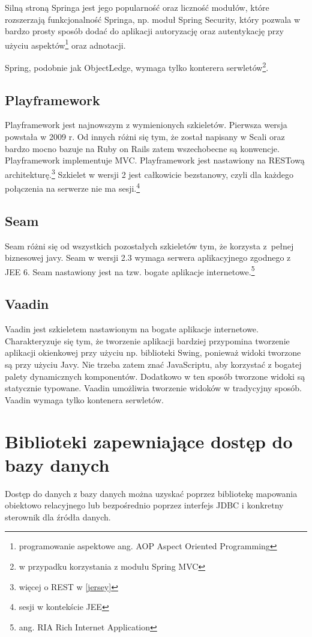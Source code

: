 \documentclass[a4paper,onecolumn,oneside,11pt,wide,floatssmall]{mwrep}
\theoremstyle{definition}
\theoremstyle{plain}%
\theoremstyle{remark}
\begin{document}
Silną stroną Springa jest jego popularność oraz liczność modułów, które rozszerzają funkcjonalność Springa, np. moduł Spring Security, który pozwala w bardzo prosty sposób dodać do aplikacji autoryzację oraz autentykację przy użyciu aspektów\footnote{programowanie aspektowe ang. AOP Aspect Oriented Programming} oraz adnotacji.

Spring, podobnie jak ObjectLedge, wymaga tylko 
konterera serwletów\footnote{w przypadku korzystania z modułu Spring MVC}.

\subsection{Playframework}
Playframework \cite{playframeworkHome} jest najnowszym z wymienionych szkieletów. Pierwsza wersja powstała w 2009 r. Od innych różni się tym, że został napisany w Scali oraz bardzo mocno bazuje na Ruby on Rails zatem wszechobecne są konwencje. Playframework implementuje MVC. Playframework jest nastawiony na RESTową architekturę.\footnote{więcej o REST w \ref{jersey}} Szkielet w wersji 2 jest całkowicie bezstanowy, czyli dla każdego połączenia na serwerze nie ma sesji.\footnote{sesji w kontekście JEE}

\subsection{Seam}
Seam \cite{seamHome} różni się od wszystkich pozostałych szkieletów tym, że korzysta \mbox{z pełnej} biznesowej javy. Seam w wersji 2.3 wymaga serwera aplikacyjnego zgodnego z JEE 6. Seam nastawiony jest na tzw. bogate aplikacje internetowe.\footnote{ang. RIA Rich Internet Application}

\subsection{Vaadin}
Vaadin \cite{vaadinHome} jest szkieletem nastawionym na bogate aplikacje internetowe. Charakteryzuje się tym, że tworzenie aplikacji bardziej przypomina tworzenie aplikacji okienkowej przy użyciu np. biblioteki Swing, ponieważ widoki tworzone są przy użyciu Javy. Nie trzeba zatem znać JavaScriptu, aby korzystać z bogatej palety dynamicznych komponentów. Dodatkowo w ten sposób tworzone widoki są statycznie typowane. Vaadin umożliwia tworzenie widoków w tradycyjny sposób. Vaadin wymaga tylko kontenera serwletów.

\section{Biblioteki zapewniające dostęp do bazy danych}
Dostęp do danych z bazy danych można uzyskać poprzez bibliotekę mapowania obiektowo relacyjnego lub bezpośrednio poprzez interfejs JDBC i konkretny sterownik dla źródła danych.
\end{document}
